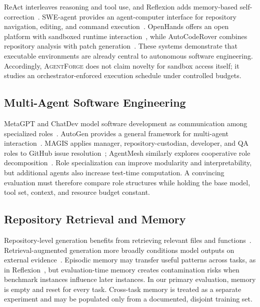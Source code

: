 \documentclass[journal]{IEEEtran}
\newcommand{\agentforge}{\textsc{AgentForge}}
\begin{document}
ReAct interleaves reasoning and tool use, and Reflexion adds memory-based self-correction~\cite{yao2023react,shinn2023reflexion}. SWE-agent provides an agent-computer interface for repository navigation, editing, and command execution~\cite{yang2024sweagent}. OpenHands offers an open platform with sandboxed runtime interaction~\cite{wang2024openhands}, while AutoCodeRover combines repository analysis with patch generation~\cite{zhang2024autocoderover}. These systems demonstrate that executable environments are already central to autonomous software engineering. Accordingly, \agentforge{} does not claim novelty for sandbox access itself; it studies an orchestrator-enforced execution schedule under controlled budgets.

\subsection{Multi-Agent Software Engineering}

MetaGPT and ChatDev model software development as communication among specialized roles~\cite{hong2023metagpt,qian2023chatdev}. AutoGen provides a general framework for multi-agent interaction~\cite{wu2023autogen}. MAGIS applies manager, repository-custodian, developer, and QA roles to GitHub issue resolution~\cite{tao2024magis}; AgentMesh similarly explores cooperative role decomposition~\cite{khanzadeh2025agentmesh}. Role specialization can improve modularity and interpretability, but additional agents also increase test-time computation. A convincing evaluation must therefore compare role structures while holding the base model, tool set, context, and resource budget constant.

\subsection{Repository Retrieval and Memory}

Repository-level generation benefits from retrieving relevant files and functions~\cite{zhang2023repocoder,shrivastava2023repofusion}. Retrieval-augmented generation more broadly conditions model outputs on external evidence~\cite{lewis2020rag}. Episodic memory may transfer useful patterns across tasks, as in Reflexion~\cite{shinn2023reflexion}, but evaluation-time memory creates contamination risks when benchmark instances influence later instances. In our primary evaluation, memory is empty and reset for every task. Cross-task memory is treated as a separate experiment and may be populated only from a documented, disjoint training set.
\end{document}
